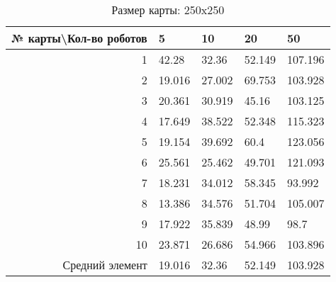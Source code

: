 \begin{table}[H]
\centering
\begin{tabular}{|r|l|l|l|l|}
\hline
№ карты\textbackslash Кол-во роботов & \textbf{5} & \textbf{10} & \textbf{20} & \textbf{50}\\ \hline
1 & 42.28 & 32.36 & 52.149 & 107.196\\ \hline
2 & 19.016 & 27.002 & 69.753 & 103.928\\ \hline
3 & 20.361 & 30.919 & 45.16 & 103.125\\ \hline
4 & 17.649 & 38.522 & 52.348 & 115.323\\ \hline
5 & 19.154 & 39.692 & 60.4 & 123.056\\ \hline
6 & 25.561 & 25.462 & 49.701 & 121.093\\ \hline
7 & 18.231 & 34.012 & 58.345 & 93.992\\ \hline
8 & 13.386 & 34.576 & 51.704 & 105.007\\ \hline
9 & 17.922 & 35.839 & 48.99 & 98.7\\ \hline
10 & 23.871 & 26.686 & 54.966 & 103.896\\ \hline
Средний элемент & 19.016 & 32.36 & 52.149 & 103.928\\ \hline
\end{tabular}
\caption*{Размер карты: 250x250}
\end{table}
